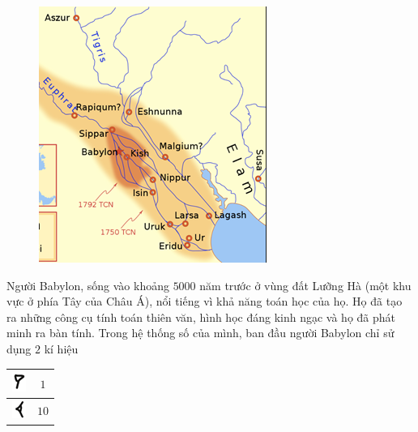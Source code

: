 	\begin{figure}
		\centering
		\vspace*{-20pt}
		\captionsetup{labelformat= empty, justification=centering}
		\includegraphics[width=1\linewidth]{17.1}
		\vspace*{-30pt}
	\end{figure}
	Người Babylon, sống vào khoảng $5000$ năm trước ở vùng đất Lưỡng Hà (một khu vực ở phía Tây của  Châu Á), nổi tiếng vì khả năng toán học của họ. Họ đã tạo ra những công cụ tính toán thiên văn, hình học đáng kinh ngạc và họ đã phát minh ra bàn tính.
	\vskip 0.1cm
	Trong hệ thống số của mình, ban đầu người Babylon chỉ sử dụng $2$ kí hiệu 
	\begin{table}[H]
		\vspace*{-5pt}
		\begin{tabular}{|c|c|}
			\hline
			\includegraphics[scale=0.7]{15}&$1$\\
			\hline
			\includegraphics[scale=0.65]{16}&$10$\\
			\hline
		\end{tabular}
		\vspace*{-10pt}
	\end{table}
